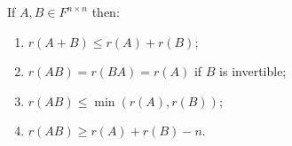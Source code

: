 If $A, B \in F^{n \times n}$ then:
\begin{enumerate}
\item $r(A + B) \leq r(A) + r(B)$;
\item $r(AB) = r(BA) = r(A)$ if $B$ is invertible;
\item $r(AB) \leq \min(r(A), r(B))$;
\item $r(AB) \geq r(A) + r(B) - n$.
\end{enumerate}
